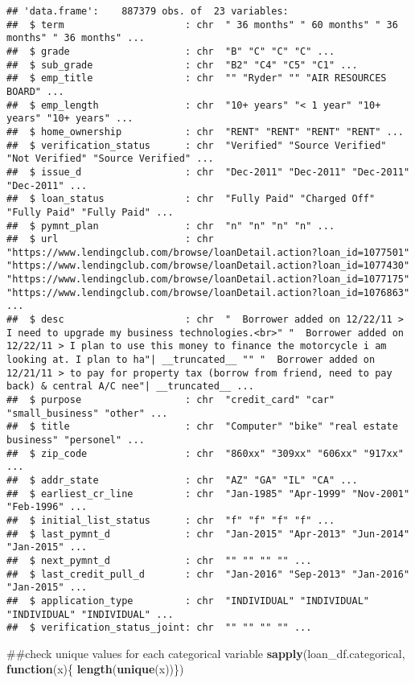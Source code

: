 \documentclass[]{article}
\newenvironment{Shaded}{\begin{snugshade}}{\end{snugshade}}
\newcommand{\KeywordTok}[1]{\textcolor[rgb]{0.13,0.29,0.53}{\textbf{#1}}}
\newcommand{\ControlFlowTok}[1]{\textcolor[rgb]{0.13,0.29,0.53}{\textbf{#1}}}
\newcommand{\NormalTok}[1]{#1}
\begin{document}
\begin{verbatim}
## 'data.frame':    887379 obs. of  23 variables:
##  $ term                     : chr  " 36 months" " 60 months" " 36 months" " 36 months" ...
##  $ grade                    : chr  "B" "C" "C" "C" ...
##  $ sub_grade                : chr  "B2" "C4" "C5" "C1" ...
##  $ emp_title                : chr  "" "Ryder" "" "AIR RESOURCES BOARD" ...
##  $ emp_length               : chr  "10+ years" "< 1 year" "10+ years" "10+ years" ...
##  $ home_ownership           : chr  "RENT" "RENT" "RENT" "RENT" ...
##  $ verification_status      : chr  "Verified" "Source Verified" "Not Verified" "Source Verified" ...
##  $ issue_d                  : chr  "Dec-2011" "Dec-2011" "Dec-2011" "Dec-2011" ...
##  $ loan_status              : chr  "Fully Paid" "Charged Off" "Fully Paid" "Fully Paid" ...
##  $ pymnt_plan               : chr  "n" "n" "n" "n" ...
##  $ url                      : chr  "https://www.lendingclub.com/browse/loanDetail.action?loan_id=1077501" "https://www.lendingclub.com/browse/loanDetail.action?loan_id=1077430" "https://www.lendingclub.com/browse/loanDetail.action?loan_id=1077175" "https://www.lendingclub.com/browse/loanDetail.action?loan_id=1076863" ...
##  $ desc                     : chr  "  Borrower added on 12/22/11 > I need to upgrade my business technologies.<br>" "  Borrower added on 12/22/11 > I plan to use this money to finance the motorcycle i am looking at. I plan to ha"| __truncated__ "" "  Borrower added on 12/21/11 > to pay for property tax (borrow from friend, need to pay back) & central A/C nee"| __truncated__ ...
##  $ purpose                  : chr  "credit_card" "car" "small_business" "other" ...
##  $ title                    : chr  "Computer" "bike" "real estate business" "personel" ...
##  $ zip_code                 : chr  "860xx" "309xx" "606xx" "917xx" ...
##  $ addr_state               : chr  "AZ" "GA" "IL" "CA" ...
##  $ earliest_cr_line         : chr  "Jan-1985" "Apr-1999" "Nov-2001" "Feb-1996" ...
##  $ initial_list_status      : chr  "f" "f" "f" "f" ...
##  $ last_pymnt_d             : chr  "Jan-2015" "Apr-2013" "Jun-2014" "Jan-2015" ...
##  $ next_pymnt_d             : chr  "" "" "" "" ...
##  $ last_credit_pull_d       : chr  "Jan-2016" "Sep-2013" "Jan-2016" "Jan-2015" ...
##  $ application_type         : chr  "INDIVIDUAL" "INDIVIDUAL" "INDIVIDUAL" "INDIVIDUAL" ...
##  $ verification_status_joint: chr  "" "" "" "" ...
\end{verbatim}

\begin{Shaded}
\begin{Highlighting}[]
\NormalTok{##check unique values for each categorical variable}
\KeywordTok{sapply}\NormalTok{(loan_df.categorical, }\ControlFlowTok{function}\NormalTok{(x)\{ }\KeywordTok{length}\NormalTok{(}\KeywordTok{unique}\NormalTok{(x))\})}
\end{Highlighting}
\end{Shaded}
\end{document}
